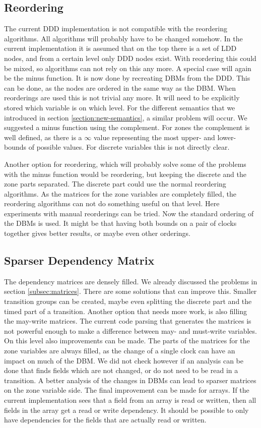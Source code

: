 \subsection{Reordering}
The current DDD implementation is not compatible with the reordering algorithms. All algorithms will probably have to be changed somehow. In the current implementation it is assumed that on the top there is a set of LDD nodes, and from a certain level only DDD nodes exist. With reordering this could be mixed, so algorithms can not rely on this any more. A special case will again be the minus function. It is now done by recreating DBMs from the DDD. This can be done, as the nodes are ordered in the same way as the DBM. When reorderings are used this is not trivial any more. It will need to be explicitly stored which variable is on which level. For the different semantics that we introduced in section \ref{section:new-semantics}, a similar problem will occur. We suggested a minus function using the complement. For zones the complement is well defined, as there is a $\infty$ value representing the most upper- and lower-bounds of possible values. For discrete variables this is not directly clear.
 
Another option for reordering, which will probably solve some of the problems with the minus function would be reordering, but keeping the discrete and the zone parts separated. The discrete part could use the normal reordering algorithms. As the matrices for the zone variables are completely filled, the reordering algorithms can not do something useful on that level. Here experiments with manual reorderings can be tried. Now the standard ordering of the DBMs is used. It might be that having both bounds on a pair of clocks together gives better results, or maybe even other orderings.

\subsection{Sparser Dependency Matrix}
The dependency matrices are densely filled. We already discussed the problems in section \ref{subsec:matrices}. There are some solutions that can improve this. Smaller transition groups can be created, maybe even splitting the discrete part and the timed part of a transition. Another option that needs more work, is also filling the may-write matrices. The current code parsing that generates the matrices is not powerful enough to make a difference between may- and must-write variables. On this level also improvements can be made. The parts of the matrices for the zone variables are always filled, as the change of a single clock can have an impact on much of the DBM. We did not check however if an analysis can be done that finds fields which are not changed, or do not need to be read in a transition. A better analysis of the changes in DBMs can lead to sparser matrices on the zone variable side. The final improvement can be made for arrays. If the current implementation sees that a field from an array is read or written, then all fields in the array get a read or write dependency. It should be possible to only have dependencies for the fields that are actually read or written.

